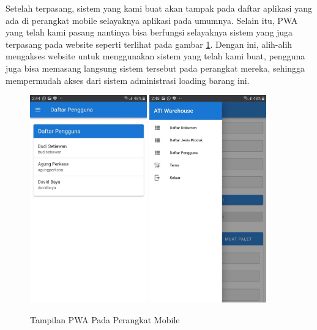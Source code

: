 Setelah terpasang, sistem yang kami buat akan tampak pada daftar aplikasi yang ada di perangkat mobile selayaknya aplikasi pada umumnya.
Selain itu, PWA yang telah kami pasang nantinya bisa berfungsi selayaknya sistem yang juga terpasang pada website seperti terlihat pada gambar \ref{fig:tampilanPwa}.
Dengan ini, alih-alih mengakses website untuk menggunakan sistem yang telah kami buat,  pengguna juga bisa memasang langsung sistem tersebut pada perangkat mereka, sehingga mempermudah akses dari sistem administrasi loading barang ini.
\vspace{0.5ex}

\begin{figure} [ht!] \centering
  \includegraphics[width=0.45\textwidth]{gambar/tampilan-pwa-1.jpg}
  \includegraphics[width=0.45\textwidth]{gambar/tampilan-pwa-2.jpg}
  \caption{Tampilan PWA Pada Perangkat Mobile}
	\label{fig:tampilanPwa}
\end{figure}

